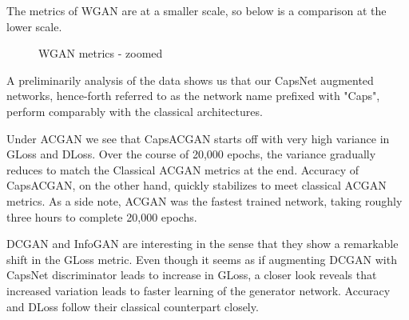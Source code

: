 \documentclass{vldb}
\begin{document}
The metrics of WGAN are at a smaller scale, so below is a comparison at the lower scale.

\begin{figure}[H]
    \centering
    \qquad
    \caption{WGAN metrics - zoomed}%
    \label{fig:wgan_metric_zoomed}%
\end{figure}
\par\bigskip

A preliminarily analysis of the data shows us that our CapsNet augmented networks, hence-forth referred to as the network name prefixed with "Caps", perform comparably with the classical architectures. 
\par\bigskip

Under ACGAN we see that CapsACGAN starts off with very high variance in GLoss and DLoss. Over the course of 20,000 epochs, the variance gradually reduces to match the Classical ACGAN metrics at the end. Accuracy of CapsACGAN, on the other hand, quickly stabilizes to meet classical ACGAN metrics. As a side note, ACGAN was the fastest trained network, taking roughly three hours to complete 20,000 epochs.
\par\bigskip

DCGAN and InfoGAN are interesting in the sense that they show a remarkable shift in the GLoss metric. Even though it seems as if augmenting DCGAN with CapsNet discriminator leads to increase in GLoss, a closer look reveals that increased variation leads to faster learning of the generator network. Accuracy and DLoss follow their classical counterpart closely.
\par\bigskip
\end{document}
